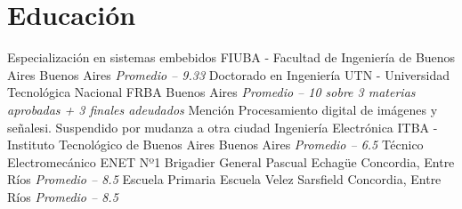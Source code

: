 \section{Educación}
 { Especialización en sistemas embebidos} { FIUBA - Facultad de Ingeniería de Buenos Aires} { Buenos Aires}          { \textit { Promedio -- 9.33}}                                            { }
 { Doctorado en Ingeniería}               { UTN - Universidad Tecnológica Nacional FRBA}    { Buenos Aires}          { \textit { Promedio -- 10 sobre 3 materias aprobadas + 3 finales adeudados}} { Mención Procesamiento digital de imágenes y señalesi. Suspendido por mudanza a otra ciudad}
 { Ingeniería Electrónica}                { ITBA - Instituto Tecnológico de Buenos Aires}   { Buenos Aires}          { \textit { Promedio -- 6.5}}                                                 { }
 { Técnico Electromecánico}               { ENET Nº1 Brigadier General Pascual Echagüe}     { Concordia, Entre Ríos} { \textit { Promedio -- 8.5}}                                                 { }
 { Escuela Primaria}                      { Escuela Velez Sarsfield}                        { Concordia, Entre Ríos} { \textit { Promedio -- 8.5}}                                                 { }

